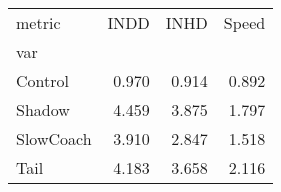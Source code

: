 \begin{tabular}{lrrr}
\toprule
metric &  INDD &  INHD &  Speed \\
var       &       &       &        \\
\midrule
Control   & 0.970 & 0.914 &  0.892 \\
Shadow    & 4.459 & 3.875 &  1.797 \\
SlowCoach & 3.910 & 2.847 &  1.518 \\
Tail      & 4.183 & 3.658 &  2.116 \\
\bottomrule
\end{tabular}
